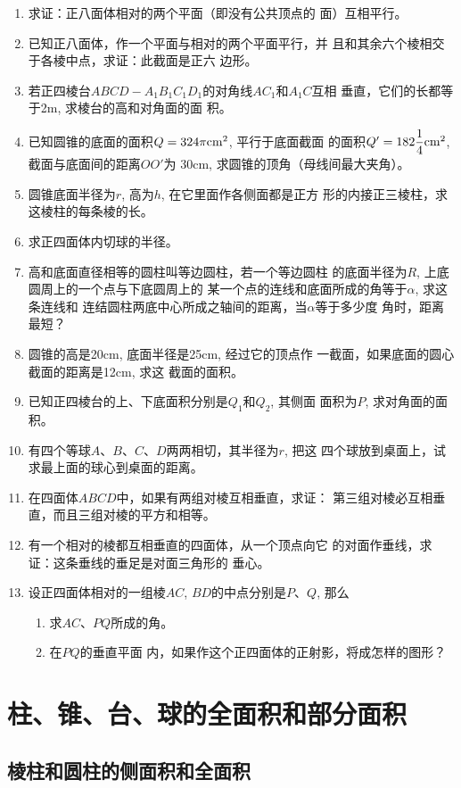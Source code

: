 \begin{enumerate}
\item 求证：正八面体相对的两个平面（即没有公共顶点的
面）互相平行。
\item 已知正八面体，作一个平面与相对的两个平面平行，并
且和其余六个棱相交于各棱中点，求证：此截面是正六
边形。
\item 若正四棱台$ABCD-A_1B_1C_1D_1$的对角线$AC_1$和$A_1C$互相
垂直，它们的长都等于2m, 求棱台的高和对角面的面
积。
\item 已知圆锥的底面的面积$Q=324\pi{\rm cm^2}$, 平行于底面截面
的面积$Q'=182\frac{1}{4}{\rm cm^2}$, 截面与底面间的距离$OO'$为
30cm, 求圆锥的顶角（母线间最大夹角）。
\item 圆锥底面半径为$r$, 高为$h$, 在它里面作各侧面都是正方
形的内接正三棱柱，求这棱柱的每条棱的长。
\item 求正四面体内切球的半径。
\item 高和底面直径相等的圆柱叫等边圆柱，若一个等边圆柱
的底面半径为$R$, 上底圆周上的一个点与下底圆周上的
某一个点的连线和底面所成的角等于$\alpha$, 求这条连线和
连结圆柱两底中心所成之轴间的距离，当$\alpha$等于多少度
角时，距离最短？
\item 圆锥的高是20cm, 底面半径是25cm, 经过它的顶点作
一截面，如果底面的圆心截面的距离是12cm, 求这
截面的面积。
\item 已知正四棱台的上、下底面积分别是$Q_1$和$Q_2$, 其侧面
面积为$P$, 求对角面的面积。
\item 有四个等球$A$、$B$、$C$、$D$两两相切，其半径为$r$, 把这
四个球放到桌面上，试求最上面的球心到桌面的距离。
\item 在四面体$ABCD$中，如果有两组对棱互相垂直，求证：
第三组对棱必互相垂直，而且三组对棱的平方和相等。
\item 有一个相对的棱都互相垂直的四面体，从一个顶点向它
的对面作垂线，求证：这条垂线的垂足是对面三角形的
垂心。
\item 设正四面体相对的一组棱$AC$, $BD$的中点分别是$P$、$Q$,
那么
\begin{enumerate}
\item 求$AC$、$PQ$所成的角。    
\item 在$PQ$的垂直平面
内，如果作这个正四面体的正射影，将成怎样的图形？
\end{enumerate}
\end{enumerate}

\section{柱、锥、台、球的全面积和部分面积}

\subsection{棱柱和圆柱的侧面积和全面积}

